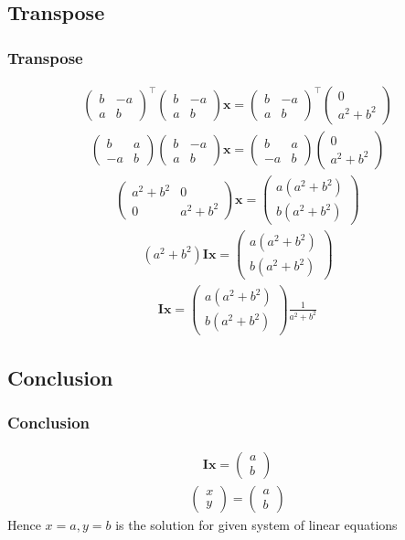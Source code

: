 \documentclass{beamer}
\providecommand{\brak}[1]{\ensuremath{\left(#1\right)}}
\theoremstyle{remark}
\newcommand{\myvec}[1]{\ensuremath{\begin{pmatrix}#1\end{pmatrix}}}
\let\vec\mathbf
\numberwithin{equation}{section}
\begin{document}
\subsection{Transpose}
\begin{frame}
\frametitle{Transpose}
 \begin{align}
    \myvec{b&-a\\a&b}^\top\myvec{b&-a\\a&b}\vec{x}= \myvec{b&-a\\a&b}^\top\myvec{0\\a^{2}+b^{2}} 
    \end{align}
       \begin{align}
    \myvec{b&a\\-a&b}\myvec{b&-a\\a&b}\vec{x}= \myvec{b&a\\-a&b}\myvec{0\\a^{2}+b^{2}}  
  \end{align}
  \begin{align}
\myvec{a^{2}+b^{2}&0\\0&a^{2}+b^{2}}\vec{x}=\myvec{a\brak{a^{2}+b^{2}}\\b\brak{a^{2}+b^{2}}}
  \end{align}
  \begin{align}
\brak{a^{2}+b^{2}}\vec{I}\vec{x}=\myvec{a\brak{a^{2}+b^{2}}\\b\brak{a^{2}+b^{2}}} 
\end{align}
\begin{align}
\vec{I}\vec{x}=\myvec{a\brak{a^{2}+b^{2}}\\b\brak{a^{2}+b^{2}}} \frac{1}{a^{2}+b^{2}} 
  \end{align}
\end{frame}
\begin{frame}
\subsection{Conclusion}
\frametitle{Conclusion}
 \begin{align}
      \vec{I}\vec{x}=\myvec{a\\b}
  \end{align}
  \begin{align}
      \myvec{x\\y}=\myvec{a\\b}
  \end{align}
  Hence $x=a,y=b$ is the solution for given system of linear equations
\end{frame}
\end{document}
